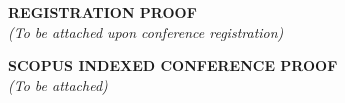 \documentclass[12pt,a4paper]{report}
\begin{document}
\newpage
\thispagestyle{plain}
\begin{center}
\vspace*{5cm}
{\Large \textbf{REGISTRATION PROOF}}\\[20pt]
\textit{(To be attached upon conference registration)}
\end{center}

\newpage
\thispagestyle{plain}
\begin{center}
\vspace*{5cm}
{\Large \textbf{SCOPUS INDEXED CONFERENCE PROOF}}\\[20pt]
\textit{(To be attached)}
\end{center}
\end{document}
